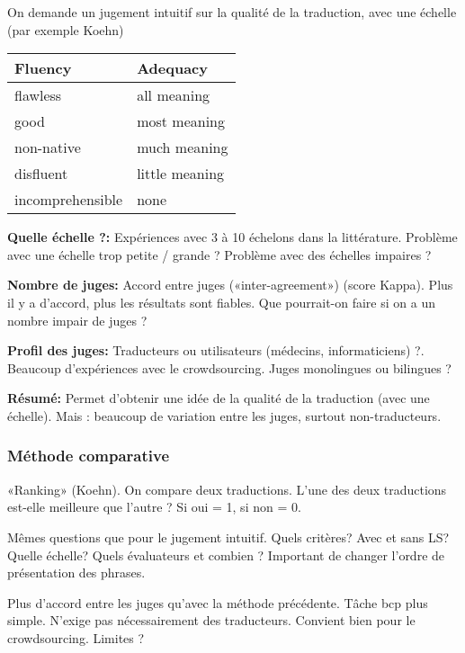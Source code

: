 On demande un jugement intuitif sur la qualité de la traduction, avec une échelle (par exemple Koehn)

\begin{table}[H]
    \centering
    \begin{tabular}{|l|l|}
    \hline
    \textbf{Fluency} & \textbf{Adequacy}       \\ \hline
    flawless         & all meaning             \\ \hline
    good             & most meaning            \\ \hline
    non-native       & much meaning            \\ \hline
    disfluent        & little meaning          \\ \hline
    incomprehensible & none                    \\ \hline
    \end{tabular}
\end{table}


\textbf{Quelle échelle ?:}
Expériences avec 3 à 10 échelons dans la littérature. Problème avec une échelle trop petite / grande ? Problème avec des échelles impaires ?

\textbf{Nombre de juges:}
Accord entre juges («inter-agreement») (score Kappa). Plus il y a d'accord, plus les résultats sont fiables. Que pourrait-on faire si on a un nombre impair de juges ?

\textbf{Profil des juges:}
Traducteurs ou utilisateurs (médecins, informaticiens) ?. Beaucoup d'expériences avec le crowdsourcing. Juges monolingues ou bilingues ?

\textbf{Résumé:}
Permet d'obtenir une idée de la qualité de la traduction (avec une échelle). Mais : beaucoup de variation entre les juges, surtout non-traducteurs.

\subsubsection{Méthode comparative}

«Ranking» (Koehn).
On compare deux traductions. L'une des deux traductions est-elle meilleure que l'autre ? Si oui = 1, si non = 0.

Mêmes questions que pour le jugement intuitif. Quels critères? Avec et sans LS? Quelle échelle? Quels évaluateurs et combien ? Important de changer l'ordre de présentation des phrases.

Plus d'accord entre les juges qu'avec la méthode précédente. Tâche bcp plus simple. N'exige pas nécessairement des traducteurs. Convient bien pour le crowdsourcing. Limites ?

